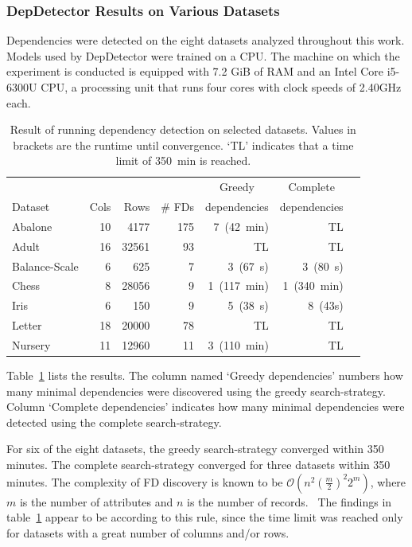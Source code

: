 \subsubsection{DepDetector Results on Various Datasets}
Dependencies were detected on the eight datasets analyzed throughout this work.
Models used by DepDetector were trained on a CPU.
The machine on which the experiment is conducted is equipped with 7.2 GiB of RAM and an Intel Core i5-6300U CPU, a processing unit that runs four cores with clock speeds of 2.40GHz each.
\begin{table}[ht]
    \centering
    \begin{tabular}{lrrrrrr}
        \toprule
        \toprule
        & & & & \multicolumn{1}{c}{Greedy} & \multicolumn{1}{c}{Complete} \\
        Dataset & Cols & Rows & \# FDs & dependencies & dependencies \\
        \midrule
        Abalone & 10 & 4177 & 175 & 7~(42~min) & TL \\
        Adult & 16 & 32561 & 93 & TL & TL \\
        Balance-Scale & 6 & 625 & 7 & 3~(67~s) & 3~(80~s) \\
        Chess & 8 & 28056 & 9 & 1~(117~min) & 1~(340~min) \\
        Iris & 6 & 150 & 9 & 5~(38~s) & 8~(43s) \\
        Letter & 18 & 20000 & 78 & TL & TL \\
        Nursery & 11 & 12960 & 11 & 3~(110~min) & TL \\
        \bottomrule
        \bottomrule
    \end{tabular}
    \caption{Result of running dependency detection on selected datasets. Values in brackets are the runtime until convergence. `TL' indicates that a time limit of 350~min is reached.}\label{tab:dep-detector-performance}
\end{table}
Table~\ref{tab:dep-detector-performance} lists the results.
The column named `Greedy dependencies' numbers how many minimal dependencies were discovered using the greedy search-strategy.
Column `Complete dependencies' indicates how many minimal dependencies were detected using the complete search-strategy.

For six of the eight datasets, the greedy search-strategy converged within 350 minutes.
The complete search-strategy converged for three datasets within 350 minutes.
The complexity of FD discovery is known to be \(\mathcal{O}(n^2(\frac{m}{2})^2 2^m)\), where \( m \) is the number of attributes and \( n \) is the number of records.~\cite[p.~2]{PAP15}
The findings in table~\ref{tab:dep-detector-performance} appear to be according to this rule, since the time limit was reached only for datasets with a great number of columns and/or rows.

